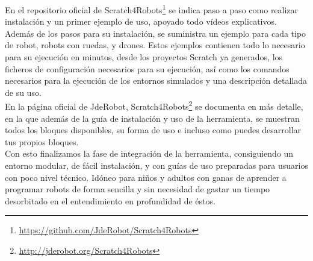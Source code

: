 En el repositorio oficial de Scratch4Robots\footnote{\url{https://github.com/JdeRobot/Scratch4Robots}} se indica paso a paso como realizar instalación y un primer ejemplo de uso, apoyado todo vídeos explicativos.\\

Además de los pasos para su instalación, se suministra un ejemplo para cada tipo de robot, robots con ruedas, y drones. Estos ejemplos contienen todo lo necesario para su ejecución en minutos, desde los proyectos Scratch ya generados, los ficheros de configuración necesarios para su ejecución, así como los comandos necesarios para la ejecución de los entornos simulados y una descripción detallada de su uso.\\

En la página oficial de JdeRobot, Scratch4Robots\footnote{\url{http://jderobot.org/Scratch4Robots}} se documenta en más detalle, en la que además de la guía de instalación y uso de la herramienta, se muestran todos los bloques disponibles, su forma de uso e incluso como puedes desarrollar tus propios bloques.\\

Con esto finalizamos la fase de integración de la herramienta, consiguiendo un entorno modular, de fácil instalación, y con guías de uso preparadas para usuarios con poco nivel técnico. Idóneo para niños y adultos con ganas de aprender a programar robots de forma sencilla y sin necesidad de gastar un tiempo desorbitado en el entendimiento en profundidad de éstos.


